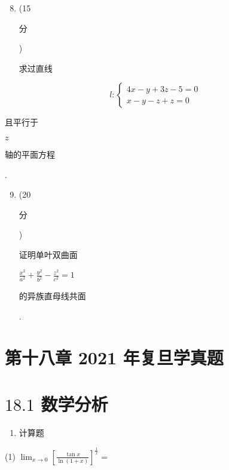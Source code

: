 \documentclass[10pt]{article}
\begin{document}
\begin{enumerate}
  \setcounter{enumi}{7}
  \item (15 \begin{CJK}{UTF8}{mj}分\end{CJK}) \begin{CJK}{UTF8}{mj}求过直线\end{CJK}
\end{enumerate}
$$
l:\left\{\begin{array}{l}
4 x-y+3 z-5=0 \\
x-y-z+z=0
\end{array}\right.
$$
\begin{CJK}{UTF8}{mj}且平行于\end{CJK} $z$ \begin{CJK}{UTF8}{mj}轴的平面方程\end{CJK}.

\begin{enumerate}
  \setcounter{enumi}{8}
  \item (20 \begin{CJK}{UTF8}{mj}分\end{CJK}) \begin{CJK}{UTF8}{mj}证明单叶双曲面\end{CJK} $\frac{x^{2}}{a^{2}}+\frac{y^{2}}{b^{2}}-\frac{z^{2}}{c^{2}}=1$ \begin{CJK}{UTF8}{mj}的异族直母线共面\end{CJK}.
\end{enumerate}
\section{第十八章 2021 年复旦学真题}
\section{$18.1$ 数学分析}
\begin{enumerate}
  \item \begin{CJK}{UTF8}{mj}计算题\end{CJK}
\end{enumerate}
(1) $\lim _{x \rightarrow 0}\left[\frac{\tan x}{\ln (1+x)}\right]^{\frac{1}{x}}=$
\end{document}
